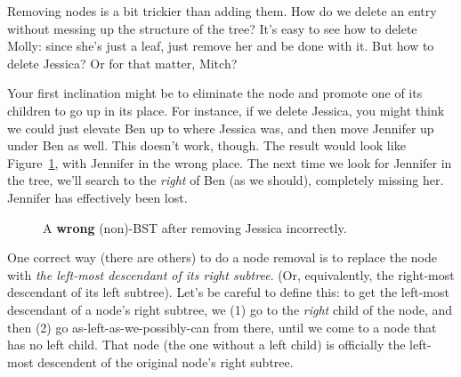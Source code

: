 Removing nodes is a bit trickier than adding them. How do we delete an
entry without messing up the structure of the tree? It's easy to see how to
delete Molly: since she's just a leaf, just remove her and be done with it.
But how to delete Jessica? Or for that matter, Mitch?

Your first inclination might be to eliminate the node and promote one of its
children to go up in its place. For instance, if we delete Jessica, you might
think we could just elevate Ben up to where Jessica was, and then move Jennifer
up under Ben as well. This doesn't work, though. The result would look like
Figure~\ref{bstremovewrong}, with Jennifer in the wrong place. The next time we
look for Jennifer in the tree, we'll search to the \textit{right} of Ben (as we
should), completely missing her. Jennifer has effectively been lost.

\begin{figure}[ht]
\centering
\begin{custommargins}{-2.1cm}{-3cm}
\caption{A \textbf{wrong} (non)-BST after removing Jessica incorrectly.}
\label{bstremovewrong}
\end{custommargins}
\end{figure}

One correct way (there are others) to do a node removal is to replace the node
with \textit{the left-most descendant of its right subtree}. (Or, equivalently,
the right-most descendant of its left subtree). Let's be careful to define
this: to get the left-most descendant of a node's right subtree, we (1) go to
the \textit{right} child of the node, and then (2) go
as-left-as-we-possibly-can from there, until we come to a node that has no
left child. That node (the one without a left child) is officially the
left-most descendent of the original node's right subtree.

